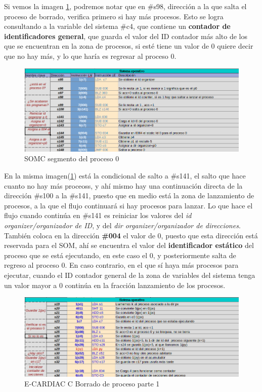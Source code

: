\documentclass[letterpaper,12pt,oneside]{book}
\begin{document}
	   
		Si vemos la imagen \ref{fig:somcNuceloP0}, podremos notar que en \#s98, dirección a la que salta el proceso de borrado, verifica primero si hay más procesos. Esto
		se logra consultando a la variable del sistema \#c4, que contiene un \textbf{contador de identificadores general}, que guarda el valor del ID contador más alto de los que
		se encuentran en la zona de procesos, si esté tiene un valor de 0 quiere decir que no hay más, y lo que haría es regresar al proceso 0.

        \begin{figure}[H]		
			\centering
			\includegraphics[scale=0.53]{media/CARDIACC/SO_Proceso0.png}
			\caption{ SOMC segmento del proceso 0}
			\label{fig:somcNuceloP0}
		\end{figure}
  
  
        En la misma imagen(\ref{fig:somcNuceloP0})
		está la condicional de salto a \#s141, el salto que hace cuanto no hay más proceoss, y ahí mismo hay una continuación directa de la dirección \#s100 a la \#s141, puesto que en medio está la zona
		de lanzamiento de procesos, a la que el flujo continuará si hay procesos para lanzar. Lo que hace el flujo cuando continúa en
		\#s141 es reiniciar los valores del \textit{id organizer/organizador de ID}, y del \textit{dir organizer/organizador de direcciones}. También coloca en la dirección \textbf{\#004} el valor de 0, puesto que esta dirección está reservada para el SOM, ahí se encuentra el valor del \textbf{identificador estático} del proceso que se está ejecutando, en este caso el 0, y posteriormente salta de regreso al proceso 0. En caso contrario, en el que sí haya más procesos para ejecutar, cuando
		el ID contador general de la zona de variables del sistema tenga un valor mayor a 0 continúa en la fracción lanzamiento de los procesos.
		
		\begin{figure}[h]		
			\centering
			\includegraphics[scale=0.53]{media/CARDIACC/SO_Borrar1.png}
			\caption{ E-CARDIAC C Borrado de proceso parte 1}
			\label{fig:somcBorrar1}
		\end{figure}
		
\end{document}
